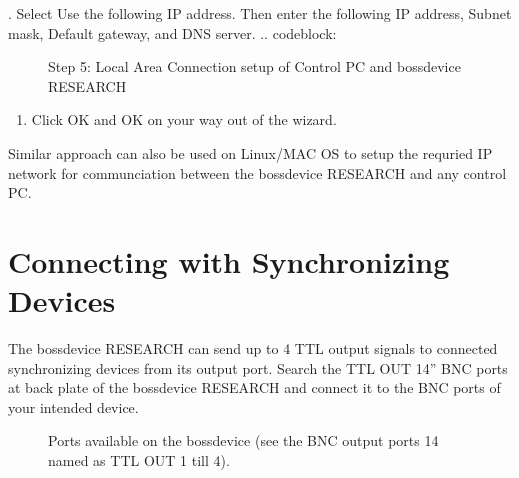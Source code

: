 \documentclass[letterpaper,10pt,english]{sphinxmanual}
\begin{document}
. Select Use the following IP address. Then enter the following IP address, Subnet mask, Default gateway, and DNS server.
.. code\sphinxhyphen{}block:

\begin{sphinxVerbatim}[commandchars=\\\{\}]
           
          
      
           
\end{sphinxVerbatim}

\begin{figure}[htbp]
\centering
\capstart

\noindent{}
\caption{Step 5: Local Area Connection setup of Control PC and bossdevice RESEARCH}\label{\detokenize{2_setup_bossdevice_research:id4}}\end{figure}
\begin{enumerate}
%
\setcounter{enumi}{5}
\item {} 
\sphinxAtStartPar
Click OK and OK on your way out of the wizard.

\end{enumerate}

\sphinxAtStartPar
Similar approach can also be used on Linux/MAC OS to setup the requried IP network for communciation between the bossdevice RESEARCH and any control PC.


\section{Connecting with Synchronizing Devices}
\label{\detokenize{2_setup_bossdevice_research:connecting-with-synchronizing-devices}}
\sphinxAtStartPar
The bossdevice RESEARCH can send up to 4 TTL output signals to connected synchronizing devices from its output port. Search the TTL OUT 1\sphinxhyphen{}4” BNC ports at back plate of the bossdevice RESEARCH and connect it to the BNC ports of your intended device.

\begin{figure}[htbp]
\centering
\capstart

\noindent{}
\caption{Ports available on the bossdevice (see the BNC output ports 1\sphinxhyphen{}4 named as TTL OUT 1 till 4).}\label{\detokenize{2_setup_bossdevice_research:id5}}\end{figure}
\end{document}
